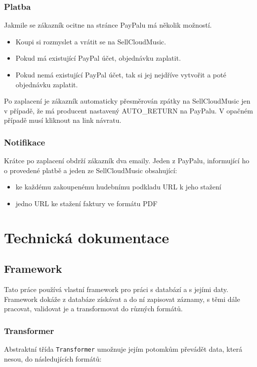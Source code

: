 \documentclass[12pt]{article}
\begin{document}
\subsubsection{Platba}
Jakmile se zákazník ocitne na stránce PayPalu má několik možností.
\begin{itemize}
\item Koupi si rozmyslet a vrátit se na SellCloudMusic.
\item Pokud má existující PayPal účet, objednávku zaplatit.
\item Pokud nemá existující PayPal účet, tak si jej nejdříve vytvořit a poté objednávku zaplatit.
\end{itemize}

Po zaplacení je zákazník automaticky přesměrován zpátky na SellCloudMusic jen v případě, že má producent nastavený AUTO\_RETURN na PayPalu. V opačném případě musí kliknout na link návratu.

\subsubsection{Notifikace}
Krátce po zaplacení obdrží zákazník dva emaily. Jeden z PayPalu, informující ho o provedené platbě a jeden ze SellCloudMusic obsahující:
\begin{itemize}
\item ke každému zakoupenému hudebnímu podkladu URL k jeho stažení
\item jedno URL ke stažení faktury ve formátu PDF
\end{itemize}


\section{Technická dokumentace}

\subsection{Framework}
Tato práce používá vlastní framework pro práci s databází a s jejími daty. Framework dokáže z databáze získávat a do ní zapisovat záznamy, s těmi dále pracovat, validovat je a transformovat do různých formátů.

\subsubsection{Transformer}
Abstraktní třída \verb|Transformer| umožnuje jejím potomkům převádět data, která nesou, do následujících formátů:
\end{document}
